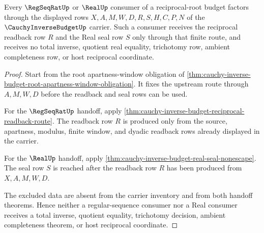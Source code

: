 \begin{theorem}
\label{thm:cauchy-inverse-budget-root-regseq-real-handoff}
Every $\RegSeqRatUp$ or $\RealUp$ consumer of a reciprocal-root budget factors through the displayed rows $X,A,M,W,D,R,S,H,C,P,N$ of the $\CauchyInverseBudgetUp$ carrier. Such a consumer receives the reciprocal readback row $R$ and the Real seal row $S$ only through that finite route, and receives no total inverse, quotient real equality, trichotomy row, ambient completeness row, or host reciprocal coordinate.
\end{theorem}
\begin{proof}
Start from the root apartness-window obligation of \autoref{thm:cauchy-inverse-budget-root-apartness-window-obligation}. It fixes the upstream route through $A,M,W,D$ before the readback and seal rows can be used.

For the $\RegSeqRatUp$ handoff, apply \autoref{thm:cauchy-inverse-budget-reciprocal-readback-route}. The readback row $R$ is produced only from the source, apartness, modulus, finite window, and dyadic readback rows already displayed in the carrier.

For the $\RealUp$ handoff, apply \autoref{thm:cauchy-inverse-budget-real-seal-nonescape}. The seal row $S$ is reached after the readback row $R$ has been produced from $X,A,M,W,D$.

The excluded data are absent from the carrier inventory and from both handoff theorems. Hence neither a regular-sequence consumer nor a Real consumer receives a total inverse, quotient equality, trichotomy decision, ambient completeness theorem, or host reciprocal coordinate.
\end{proof}

